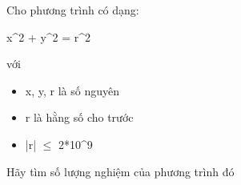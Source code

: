 Cho phương trình có dạng:

x^2 + y^2 = r^2

với
\begin{itemize}
	\item x, y, r là số nguyên
	\item r là hằng số cho trước
	\item |r|  $\le$  2*10^9
\end{itemize}

Hãy tìm số lượng nghiệm của phương trình đó